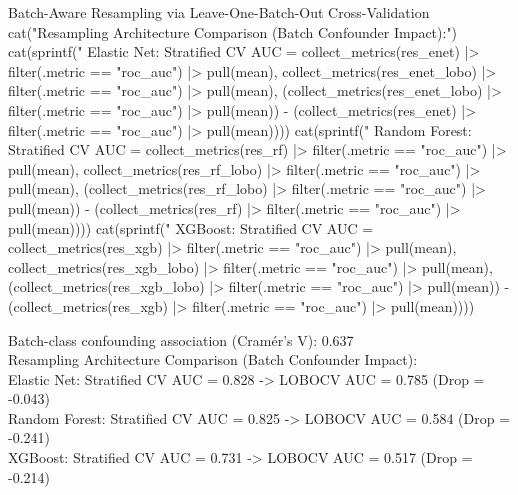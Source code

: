 \documentclass[11pt,oneside]{book}
\begin{document}
\begin{rchunk}{Batch-Aware Resampling via Leave-One-Batch-Out Cross-Validation}
cat("Resampling Architecture Comparison (Batch Confounder Impact):\n")
cat(sprintf("  Elastic Net:   Stratified CV AUC = %
            collect_metrics(res_enet) |> filter(.metric == "roc_auc") |> pull(mean),
            collect_metrics(res_enet_lobo) |> filter(.metric == "roc_auc") |> pull(mean),
            (collect_metrics(res_enet_lobo) |> filter(.metric == "roc_auc") |> pull(mean)) -
            (collect_metrics(res_enet) |> filter(.metric == "roc_auc") |> pull(mean))))
cat(sprintf("  Random Forest: Stratified CV AUC = %
            collect_metrics(res_rf) |> filter(.metric == "roc_auc") |> pull(mean),
            collect_metrics(res_rf_lobo) |> filter(.metric == "roc_auc") |> pull(mean),
            (collect_metrics(res_rf_lobo) |> filter(.metric == "roc_auc") |> pull(mean)) -
            (collect_metrics(res_rf) |> filter(.metric == "roc_auc") |> pull(mean))))
cat(sprintf("  XGBoost:       Stratified CV AUC = %
            collect_metrics(res_xgb) |> filter(.metric == "roc_auc") |> pull(mean),
            collect_metrics(res_xgb_lobo) |> filter(.metric == "roc_auc") |> pull(mean),
            (collect_metrics(res_xgb_lobo) |> filter(.metric == "roc_auc") |> pull(mean)) -
            (collect_metrics(res_xgb) |> filter(.metric == "roc_auc") |> pull(mean))))
\end{rchunk}

\begin{routput}
Batch-class confounding association (Cram\'er's V): 0.637\\
Resampling Architecture Comparison (Batch Confounder Impact):\\
\hspace*{2em}Elastic Net:   Stratified CV AUC = 0.828  ->  LOBOCV AUC = 0.785 (Drop = -0.043)\\
\hspace*{2em}Random Forest: Stratified CV AUC = 0.825  ->  LOBOCV AUC = 0.584 (Drop = -0.241)\\
\hspace*{2em}XGBoost:       Stratified CV AUC = 0.731  ->  LOBOCV AUC = 0.517 (Drop = -0.214)
\end{routput}

\clearpage
\end{document}
